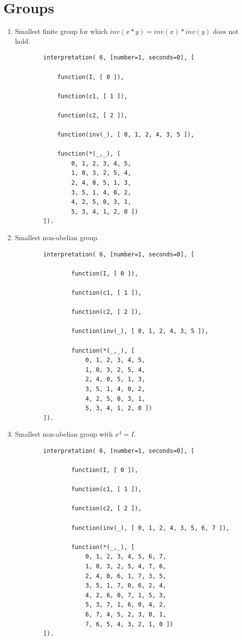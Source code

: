 \documentclass{scrartcl}
\begin{document}
\appendix
\pagebreak
\section{Groups}
\label{apx: groups}
\begin{enumerate}[label=\alph*)]
	\item
		Smallest finite group for which $inv(x*y)=inv(x)*inv(y)$ does not hold.
		\begin{verbatim}
		interpretation( 6, [number=1, seconds=0], [

		    function(I, [ 0 ]),

		    function(c1, [ 1 ]),

		    function(c2, [ 2 ]),

		    function(inv(_), [ 0, 1, 2, 4, 3, 5 ]),

		    function(*(_,_), [
		        0, 1, 2, 3, 4, 5,
		        1, 0, 3, 2, 5, 4,
		        2, 4, 0, 5, 1, 3,
		        3, 5, 1, 4, 0, 2,
		        4, 2, 5, 0, 3, 1,
		        5, 3, 4, 1, 2, 0 ])
		]).
		\end{verbatim}

	\item
		Smallest non-abelian group.
		\begin{verbatim}
		interpretation( 6, [number=1, seconds=0], [

			    function(I, [ 0 ]),

			    function(c1, [ 1 ]),

			    function(c2, [ 2 ]),

			    function(inv(_), [ 0, 1, 2, 4, 3, 5 ]),

			    function(*(_,_), [
			        0, 1, 2, 3, 4, 5,
			        1, 0, 3, 2, 5, 4,
			        2, 4, 0, 5, 1, 3,
			        3, 5, 1, 4, 0, 2,
			        4, 2, 5, 0, 3, 1,
			        5, 3, 4, 1, 2, 0 ])
		]).
		\end{verbatim}

	\item
		\pagebreak
		Smallest non-abelian group with $x^4 = I$.
		\begin{verbatim}
		interpretation( 6, [number=1, seconds=0], [

			    function(I, [ 0 ]),

			    function(c1, [ 1 ]),

			    function(c2, [ 2 ]),

			    function(inv(_), [ 0, 1, 2, 4, 3, 5, 6, 7 ]),

			    function(*(_,_), [
			        0, 1, 2, 3, 4, 5, 6, 7,
			        1, 0, 3, 2, 5, 4, 7, 6,
			        2, 4, 0, 6, 1, 7, 3, 5,
			        3, 5, 1, 7, 0, 6, 2, 4,
			        4, 2, 6, 0, 7, 1, 5, 3,
			        5, 3, 7, 1, 6, 0, 4, 2,
			        6, 7, 4, 5, 2, 3, 0, 1,
			        7, 6, 5, 4, 3, 2, 1, 0 ])
		]).
		\end{verbatim}
\end{enumerate}
\end{document}
